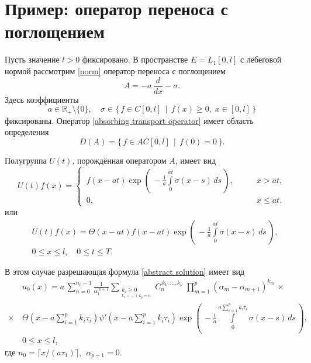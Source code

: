 \documentclass{article}
\renewcommand{\le}{\leqslant}
\renewcommand{\ge}{\geqslant}
\theoremstyle{definition}
\begin{document}
\newpage

\section{Пример: оператор переноса с поглощением}
Пусть значение $l > 0$ фиксировано. В пространстве \mbox{$E = L_1[0,l]$} с лебеговой нормой рассмотрим \eqref{norm} 
оператор переноса с поглощением
\begin{equation} \label{absorbing transport operator}
	A = -a\,\dfrac{d}{dx} - \sigma.
\end{equation}
Здесь коэффициенты 
\begin{equation*}
	a \in \mathbb{R}_+ \setminus \{0\}, \quad\sigma \in \{\, f \in C[0,l] \;\, | \;\, f(x) \ge 0, \; x \in [0,l] \,\}
\end{equation*}
фиксированы. Оператор \eqref{absorbing transport operator} имеет область определения 
\begin{equation*}
	D(A) = \{\, f \in AC[0,l] \;\, | \;\, f(0) = 0 \,\}.
\end{equation*}

Полугруппа $U(t)$, порождённая оператором $A$, имеет вид 
\begin{equation*}
U(t)f(x) = 
	\begin{cases}
		\,f(x - at)\exp\left(\, -\frac{1}{a}\int\limits_{0}^{at}\sigma(x - s) \,ds \,\right), & \qquad x > at, \\
		\,0, & \qquad x \le at.
	\end{cases}
\end{equation*}
или
\begin{equation}
\begin{aligned}
	& U(t)f(x) = \Theta(x - at)f(x - at)\exp\left(\, -\frac{1}{a}\int\limits_{0}^{at}\sigma(x - s) \,ds \,\right), \\[3mm]
	& 0 \le x \le l, \quad 0 \le t \le T.
\end{aligned}	
\end{equation}

В этом случае разрешающая формула \eqref{abstract solution} имеет вид
\begin{equation} \label{non-homogenous solution}
\begin{aligned}
	& u_0(x) = a\,\sum\limits_{n = 0}^{n_0 - 1} \frac{1}{\alpha_1^{\,\,n + 1}}
	\sum\limits_{\substack{{k_i \ge 0} \\_{k_1 + ... + k_p = n}}}\!\!\!\!C_n^{\,k_1, ..., k_p}\; 
	\prod_{m = 1}^{p}(\alpha_m - \alpha_{m + 1})^{k_m} \,\times \\[2mm] \times\,
	& \Theta\!\left(x - a\sum\limits_{i = 1}^{p}k_i\tau_i \right)\psi'\!\left(x - a\sum\limits_{i = 1}^{p}k_i\tau_i\right)
	\exp\left(\, -\frac{1}{a}\int\limits_{0}^{a\sum\limits_{i = 1}^{p}k_i\tau_i}\sigma(x - s) \,ds \,\right), \\[3mm] 
	& 0 \le x \le l,
\end{aligned}
\end{equation}
где $n_0 = \lceil x / (a\tau_1) \rceil$, $\;\alpha_{p + 1} = 0$.
\end{document}
